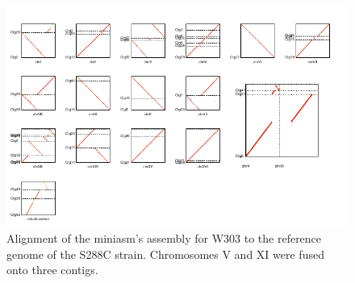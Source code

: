 \begin{figure}[!hpt]
\centering
\includegraphics[width=19cm]{images/suppFigure5.pdf}
\caption[Alignment of the miniasm's assembly for \sce{} W303 to the reference
genome of the S288C strain]{Alignment of the miniasm's assembly for \sce{} W303 to the reference genome of the S288C strain. Chromosomes V and XI were fused onto three contigs.}
\label{SF:alignW303Min}
\end{figure}

\clearpage

